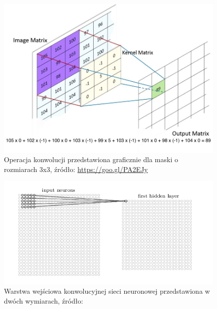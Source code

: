 \begin{figure}[ht!]
\centering
\includegraphics[scale=0.5]{res/exConvolution2.jpg}
\caption[Caption for LOF]{Operacja konwolucji przedstawiona graficznie dla maski o rozmiarach 3x3, źródło: \url{https://goo.gl/PA2EJy}\label{exConvolution}} 
\end{figure}

\begin{figure}[ht!]
\centering
\includegraphics[scale=0.6]{res/cnn1.png}
\caption[Caption for LOF]{Warstwa wejściowa konwolucyjnej sieci neuronowej przedstawiona w dwóch wymiarach, źródło:\cite{nielsen}\label{cnn1}} 
\end{figure}

